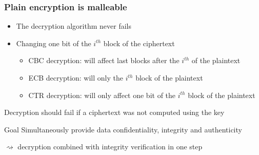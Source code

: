 \documentclass[aspectratio=169, lualatex, 10pt,dvipsnames,svgnames]{beamer} %
\def\enrouge#1{\textcolor{rouge}{#1}}
\begin{document}
\begin{frame}
  \frametitle{Plain encryption is malleable}

  \begin{itemize}
  \item The decryption algorithm never fails
  \item Changing one bit of the $i^{th}$ block of the ciphertext
    \begin{itemize}
    \item CBC decryption: will affect last blocks after the $i^{th}$ of the plaintext
    \item ECB decryption: will only the $i^{th}$ block of the plaintext
    \item CTR decryption: will only affect one bit of the $i^{th}$ block of the plaintext
    \end{itemize}
    
  \end{itemize}
  \bigskip{}

  \begin{block}{}
    Decryption should fail if a ciphertext was not computed using the key
  \end{block}
  \begin{block}{Goal}
    Simultaneously provide data \enrouge{confidentiality}, \enrouge{integrity} and \enrouge{authenticity}
    
    \enrouge{$\rightsquigarrow$} decryption combined with integrity verification in one step
  \end{block}


\end{frame}
\end{document}
